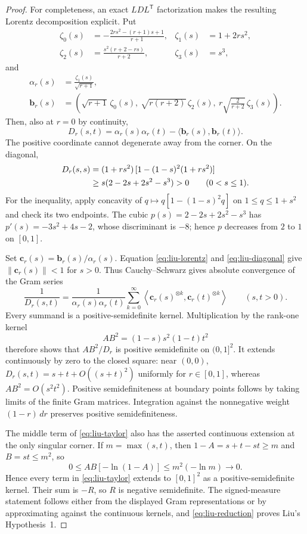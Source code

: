\documentclass[11pt]{article}
\theoremstyle{plain}
\theoremstyle{definition}
\theoremstyle{remark}
\begin{document}
\begin{proof}
For completeness, an exact $LDL^{\mathsf T}$ factorization makes the resulting
Lorentz decomposition explicit.  Put
\[
\begin{aligned}
\zeta_0(s)&=-\frac{2rs^2-(r+1)s+1}{r+1},
&\zeta_1(s)&=1+2rs^2,\\
\zeta_2(s)&=\frac{s^2(r+2-rs)}{r+2},
&\zeta_3(s)&=s^3,
\end{aligned}
\]
and
\[
\begin{aligned}
\alpha_r(s)&=\frac{\zeta_1(s)}{\sqrt{r+1}},\\
\mathbf b_r(s)&=\left(
\sqrt{r+1}\,\zeta_0(s),\
\sqrt{r(r+2)}\,\zeta_2(s),\
r\sqrt{\frac{2}{r+2}}\,\zeta_3(s)
\right).
\end{aligned}
\]
Then, also at $r=0$ by continuity,
\begin{equation}
D_r(s,t)=\alpha_r(s)\alpha_r(t)
-\langle\mathbf b_r(s),\mathbf b_r(t)\rangle.
\label{eq:liu-lorentz}
\end{equation}
The positive coordinate cannot degenerate away from the corner.  On the
diagonal,
\begin{align}
D_r(s,s)
&=(1+rs^2)\,[1-(1-s)^2(1+rs^2)]\notag\\
&\ge s(2-2s+2s^2-s^3)>0
\qquad(0<s\le1).
\label{eq:liu-diagonal}
\end{align}
For the inequality, apply concavity of
$q\mapsto q[1-(1-s)^2q]$ on $1\le q\le1+s^2$ and check its two endpoints.
The cubic $p(s)=2-2s+2s^2-s^3$ has
$p'(s)=-3s^2+4s-2$, whose discriminant is $-8$; hence $p$ decreases from
$2$ to $1$ on $[0,1]$.

Set $\mathbf c_r(s)=\mathbf b_r(s)/\alpha_r(s)$.  Equation
\eqref{eq:liu-lorentz} and \eqref{eq:liu-diagonal} give
$\|\mathbf c_r(s)\|<1$ for $s>0$.  Thus Cauchy--Schwarz gives absolute
convergence of the Gram series
\begin{equation}
\frac1{D_r(s,t)}
=\frac1{\alpha_r(s)\alpha_r(t)}
\sum_{k=0}^{\infty}
\left\langle
\mathbf c_r(s)^{\otimes k},\mathbf c_r(t)^{\otimes k}
\right\rangle
\qquad(s,t>0).
\label{eq:liu-geometric}
\end{equation}
Every summand is a positive-semidefinite kernel.  Multiplication by the
rank-one kernel
\[
AB^2=(1-s)s^2(1-t)t^2
\]
therefore shows that $AB^2/D_r$ is positive semidefinite on $(0,1]^2$.
It extends continuously by zero to the closed square: near $(0,0)$,
$D_r(s,t)=s+t+O((s+t)^2)$ uniformly for $r\in[0,1]$, whereas
$AB^2=O(s^2t^2)$.  Positive semidefiniteness at boundary points follows by
taking limits of the finite Gram matrices.  Integration against the
nonnegative weight $(1-r)\,dr$ preserves positive semidefiniteness.

The middle term of \eqref{eq:liu-taylor} also has the asserted continuous
extension at the only singular corner.  If $m=\max(s,t)$, then
$1-A=s+t-st\ge m$ and $B=st\le m^2$, so
\[
0\le AB[-\ln(1-A)]\le m^2(-\ln m)\longrightarrow0.
\]
Hence every term in \eqref{eq:liu-taylor} extends to $[0,1]^2$ as a
positive-semidefinite kernel.  Their sum is $-R$, so $R$ is negative
semidefinite.  The signed-measure statement follows either from the displayed
Gram representations or by approximating against the continuous kernels, and
\eqref{eq:liu-reduction} proves Liu's Hypothesis~1.
\end{proof}
\end{document}
